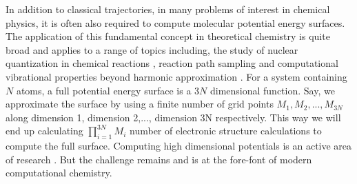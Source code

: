 In addition to classical trajectories, in many problems of interest in
chemical physics, it is often also required to compute molecular
potential energy surfaces. The application of this fundamental concept in
theoretical chemistry is quite broad and applies to a range of topics
including, the study of nuclear quantization in chemical reactions
\cite{polarizability1,dikenHeadrick}, reaction path sampling
\cite{Bolhuis,Dellago,Elber,Gillilan,Henkelman,MacFadyen,Voter,Carter,
VoterChemPhys,VoterPhysRev} and computational vibrational properties
beyond harmonic approximation \cite{HuangIyengar,Makri,Cao,Bowman,Gerber,
Jung,Matsunaga,McCoy1,McCoy2,IyengarParker,Meyer}. For a system containing
$N$ atoms, a full potential energy surface is a $3N$ dimensional function. Say,
we approximate the
surface by using a finite number of grid points {$M_1,M_2,...,M_{3N}$} along dimension 1,
dimension 2,..., dimension 3N respectively. This way we will end up calculating
{$\displaystyle\prod_{i=1}^{3N} M_{i}$} number of electronic structure calculations
to compute the full surface. Computing high dimensional potentials is an active
area of research \cite{Varandas-PES, truhlar, Bowman-IRPC-PES, ee-mbe-water,
conte2015permutationally, mancini2014new, wang2016five, conte2015trajectory,
yu2017high, Bowman-polybasis-fitting, aph, saller2014basis, reilly2010determination,
collins2011ab, evenhuis2005interpolation, zhou2011ab, qwaimd, sumner2007quantum,
qwaimd-SLO-1, fragAIMD, fragAIMD-elbo, fragAIMD-CC, behler2015constructing,
rupp2015machine, botu2015adaptive, kohonen1988introduction, handley2010potential,
manzhos2015neural, natarajan2015representing, behler2007generalized,
behler2011neural}. But the challenge remains and is at the fore-font of modern
computational chemistry.

